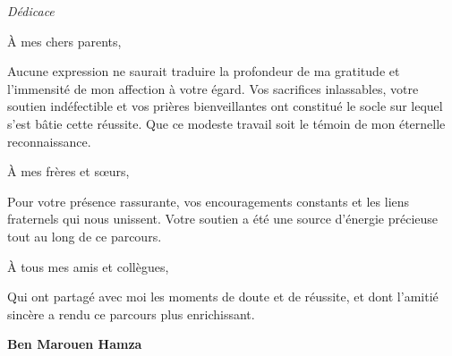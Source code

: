 \newpage
\thispagestyle{plain}
\vspace*{1.5cm}

\begin{center}
    {\Large \textit{Dédicace}}
\end{center}

\vspace{1.5cm}

\begin{center}
\begin{minipage}{0.68\textwidth}
\itshape
\setlength{\parindent}{0pt}
\setlength{\parskip}{0.45cm}

À mes chers parents,

Aucune expression ne saurait traduire la profondeur de ma gratitude et l'immensité de mon affection à votre égard. Vos sacrifices inlassables, votre soutien indéfectible et vos prières bienveillantes ont constitué le socle sur lequel s'est bâtie cette réussite. Que ce modeste travail soit le témoin de mon éternelle reconnaissance.

À mes frères et sœurs,

Pour votre présence rassurante, vos encouragements constants et les liens fraternels qui nous unissent. Votre soutien a été une source d'énergie précieuse tout au long de ce parcours.

À tous mes amis et collègues,

Qui ont partagé avec moi les moments de doute et de réussite, et dont l'amitié sincère a rendu ce parcours plus enrichissant.

\vspace{0.6cm}

\textbf{Ben Marouen Hamza}

\end{minipage}
\end{center}
